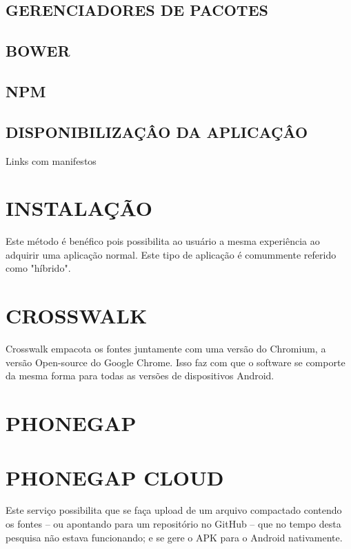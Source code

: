\documentclass[11pt,a4paper]{article}
\begin{document}
\subsection{GERENCIADORES DE PACOTES}

\subsection{BOWER}


\subsection{NPM}


\subsection{DISPONIBILIZAÇÂO DA APLICAÇÂO}

Links com manifestos

\section{ INSTALAÇÃO}

Este método é benéfico pois possibilita ao usuário a mesma
experiência ao adquirir uma aplicação normal. Este tipo de
aplicação é comummente referido como "híbrido".

\section{ CROSSWALK}

Crosswalk empacota os fontes juntamente com uma versão do Chromium, a
versão Open-source do Google Chrome. Isso faz com que o software se
comporte da mesma forma para todas as versões de dispositivos Android.

\section{ PHONEGAP}

\section{ PHONEGAP CLOUD}

Este serviço possibilita que se faça upload de um arquivo compactado
contendo os fontes – ou apontando para um repositório no GitHub –
que no tempo desta pesquisa não estava funcionando; e se gere o APK
para o Android nativamente.
\end{document}
